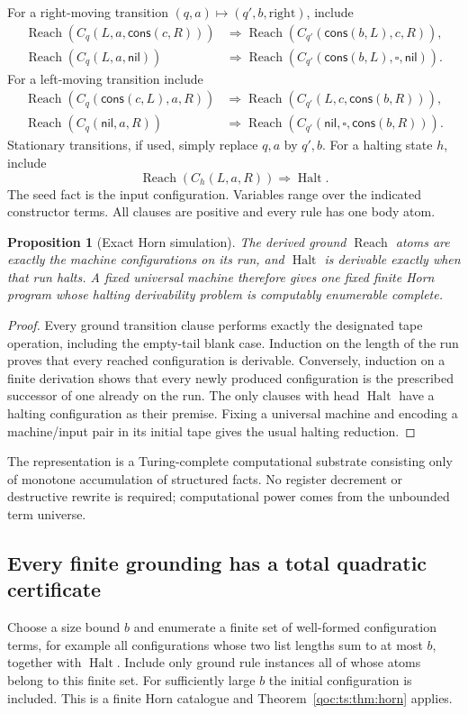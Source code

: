 \documentclass[11pt,letterpaper]{article}
\newtheorem{proposition}[theorem]{Proposition}
\theoremstyle{definition}
\theoremstyle{remark}
\DeclareMathOperator{\Reach}{Reach}
\DeclareMathOperator{\Halt}{Halt}
\begin{document}
For a right-moving transition $(q,a)\mapsto(q',b,\mathrm{right})$, include
\begin{align*}
 \Reach(C_q(L,a,\mathsf{cons}(c,R)))
 &\Rightarrow\Reach(C_{q'}(\mathsf{cons}(b,L),c,R)),\\
 \Reach(C_q(L,a,\mathsf{nil}))
 &\Rightarrow\Reach(C_{q'}(\mathsf{cons}(b,L),\square,\mathsf{nil})).
\end{align*}
For a left-moving transition include
\begin{align*}
 \Reach(C_q(\mathsf{cons}(c,L),a,R))
 &\Rightarrow\Reach(C_{q'}(L,c,\mathsf{cons}(b,R))),\\
 \Reach(C_q(\mathsf{nil},a,R))
 &\Rightarrow\Reach(C_{q'}(\mathsf{nil},\square,\mathsf{cons}(b,R))).
\end{align*}
Stationary transitions, if used, simply replace $q,a$ by $q',b$.
For a halting state $h$, include
\[
 \Reach(C_h(L,a,R))\Rightarrow\Halt.
\]
The seed fact is the input configuration. Variables range over the
indicated constructor terms. All clauses are positive and every rule has
one body atom.

\begin{proposition}[Exact Horn simulation]\label{qoc:ts:prop:tmhorn}
The derived ground $\Reach$ atoms are exactly the machine configurations
on its run, and $\Halt$ is derivable exactly when that run halts. A fixed
universal machine therefore gives one fixed finite Horn program whose
halting derivability problem is computably enumerable complete.
\end{proposition}
\begin{proof}
Every ground transition clause performs exactly the designated tape
operation, including the empty-tail blank case. Induction on the length
of the run proves that every reached configuration is derivable.
Conversely, induction on a finite derivation shows that every newly
produced configuration is the prescribed successor of one already on
the run. The only clauses with head $\Halt$ have a halting configuration
as their premise. Fixing a universal machine and encoding a machine/input
pair in its initial tape gives the usual halting reduction.
\end{proof}

The representation is a Turing-complete computational substrate consisting
only of monotone accumulation of structured facts. No register decrement
or destructive rewrite is required; computational power comes from the
unbounded term universe.

\subsection{Every finite grounding has a total quadratic certificate}
Choose a size bound $b$ and enumerate a finite set of well-formed
configuration terms, for example all configurations whose two list lengths
sum to at most $b$, together with $\Halt$. Include only ground rule
instances all of whose atoms belong to this finite set. For sufficiently
large $b$ the initial configuration is included. This is a finite Horn
catalogue and Theorem~\ref{qoc:ts:thm:horn} applies.
\end{document}
